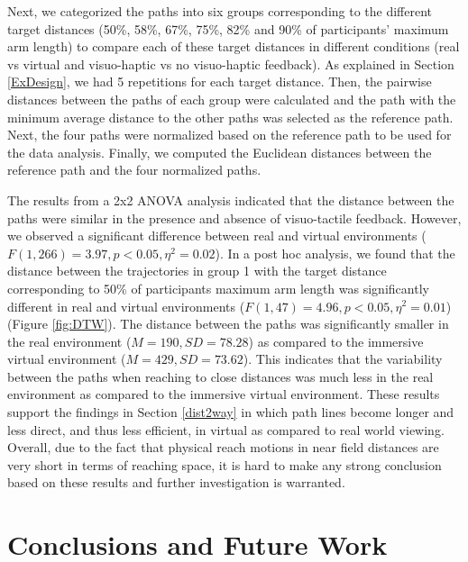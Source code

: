 Next, we categorized the paths into six groups corresponding to the different target distances (50\%, 58\%, 67\%, 75\%, 82\% and 90\% of participants' maximum arm length) to compare each of these target distances in different conditions (real vs virtual and visuo-haptic vs no visuo-haptic feedback). As explained in Section \ref{ExDesign}, we had 5 repetitions for each target distance. Then, the pairwise distances between the paths of each group were calculated and the path with the minimum average distance to the other paths was selected as the reference path. Next, the four paths were normalized based on the reference path to be used for the data analysis. Finally, we computed the Euclidean distances between the reference path and the four normalized paths.

The results from a 2x2 ANOVA analysis indicated that the distance between the paths were similar in the presence and absence of visuo-tactile feedback. However, we observed a significant difference between real and virtual environments ($F(1,266)=3.97, p<0.05, \eta^2=0.02$). In a post hoc analysis, we found that the distance between the trajectories in group 1 with the target distance corresponding to 50\% of participants maximum arm length was significantly different in real and virtual environments ($F(1,47)=4.96, p<0.05, \eta^2=0.01$) (Figure \ref{fig:DTW}). The distance between the paths was significantly smaller in the real environment ($M=190, SD=78.28$) as compared to the immersive virtual environment ($M=429, SD=73.62$). This indicates that the variability between the paths when reaching to close distances was much less in the real environment as compared to the immersive virtual environment. These results support the findings in Section \ref{dist2way} in which path lines become longer and less direct, and thus less efficient, in virtual as compared to real world viewing. Overall, due to the fact that physical reach motions in near field distances are very short in terms of reaching space, it is hard to make any strong conclusion based on these results and further investigation is warranted. 


\section{Conclusions and Future Work}

